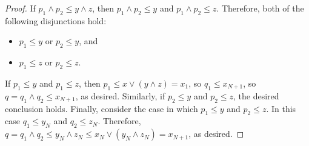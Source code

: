 \begin{proof}
If $p_1 \wedge p_2 \leq y \wedge z$, then 
$p_1 \wedge p_2 \leq y$ and $p_1 \wedge p_2 \leq z$. Therefore, both of the following disjunctions hold:
\begin{itemize}
  \item $p_1 \leq y$ or $p_2 \leq y$, and 
  \item $p_1 \leq z$ or $p_2 \leq z$. 
\end{itemize}
If $p_1 \leq y$ and $p_1 \leq z$, then $p_1 \leq x \vee (y\wedge z) = x_1$, so $q_1 \leq x_{N+1}$, so $q = q_1\wedge q_2 \leq x_{N+1}$, as desired.
Similarly, if $p_2 \leq y$ and $p_2 \leq z$, the desired conclusion holds.
Finally, consider the case in which $p_1 \leq y$ and $p_2 \leq z$. In this case $q_1 \leq y_N$ and $q_2 \leq z_N$.  Therefore, $q = q_1 \wedge q_2 \leq y_N \wedge z_N \leq x_N \vee (y_N\wedge z_N) = x_{N+1}$, as desired.
\end{proof}











































